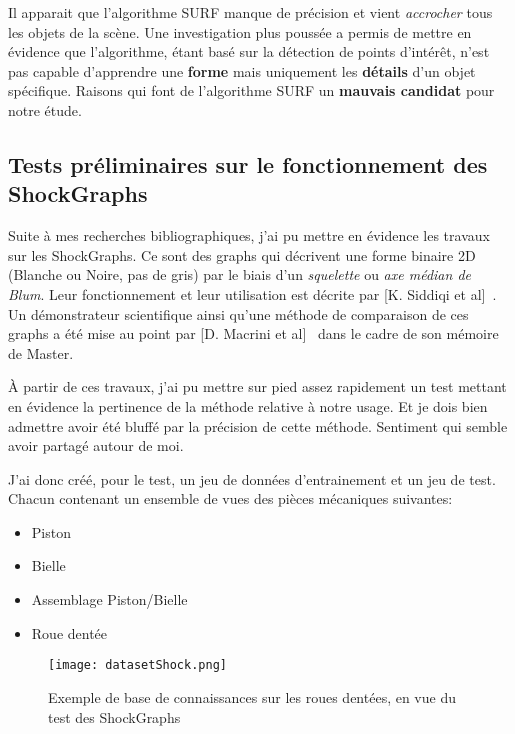 Il apparait que l'algorithme SURF manque de précision et vient \textit{accrocher} tous les objets de la scène. Une investigation plus poussée a permis de mettre en évidence que l'algorithme, étant basé sur la détection de points d'intérêt, n'est pas capable d'apprendre une \textbf{forme} mais uniquement les \textbf{détails} d'un objet spécifique. Raisons qui font de l'algorithme SURF un \textbf{mauvais candidat} pour notre étude.

\clearpage
\subsection{Tests préliminaires sur le fonctionnement des ShockGraphs}

Suite à mes recherches bibliographiques, j'ai pu mettre en évidence les travaux sur les ShockGraphs. Ce sont des graphs qui décrivent une forme binaire 2D (Blanche ou Noire, pas de gris) par le biais d'un \textit{squelette} ou \textit{axe médian de Blum}. Leur fonctionnement et leur utilisation est décrite par [K. Siddiqi et al]~\cite{Siddiqi1999}. Un démonstrateur scientifique ainsi qu'une méthode de comparaison de ces graphs a été mise au point par [D. Macrini et al]~\cite{Macrini2002} dans le cadre de son mémoire de Master.

À partir de ces travaux, j'ai pu mettre sur pied assez rapidement un test mettant en évidence la pertinence de la méthode relative à notre usage. Et je dois bien admettre avoir été bluffé par la précision de cette méthode. Sentiment qui semble avoir partagé autour de moi.

J'ai donc créé, pour le test, un jeu de données d'entrainement et un jeu de test. Chacun contenant un ensemble de vues des pièces mécaniques suivantes:
\begin{itemize}
	\item 	Piston
	\item	Bielle
	\item	Assemblage Piston/Bielle
	\item	Roue dentée
\end{itemize}
\vspace{5mm}

\begin{figure}[H]
    \centering
    \texttt{[image: datasetShock.png]}
	\caption{Exemple de base de connaissances sur les roues dentées, en vue du test des ShockGraphs}\label{image.ShockGearDataset} 
\end{figure}
\vspace{-4mm}

